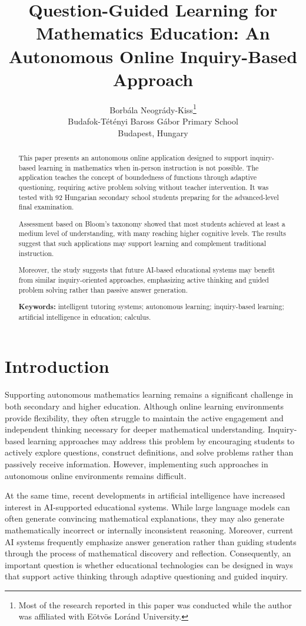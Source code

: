 \documentclass[11pt]{article}
\title{\textbf{Question-Guided Learning for Mathematics Education: An Autonomous Online Inquiry-Based Approach}}
\author{
Borbála Neogrády-Kiss\thanks{Most of the research reported in this paper was conducted while the author was affiliated with Eötvös Loránd University.}\\
Budafok-Tétényi Baross Gábor Primary School\\
Budapest, Hungary
}
\date{}
\begin{document}
\maketitle

\begin{abstract}

This paper presents an autonomous online application designed to support inquiry-based learning in mathematics when in-person instruction is not possible. The application teaches the concept of boundedness of functions through adaptive questioning, requiring active problem solving without teacher intervention. It was tested with 92 Hungarian secondary school students preparing for the advanced-level final examination.

Assessment based on Bloom's taxonomy showed that most students achieved at least a medium level of understanding, with many reaching higher cognitive levels. The results suggest that such applications may support learning and complement traditional instruction.

Moreover, the study suggests that future AI-based educational systems may benefit from similar inquiry-oriented approaches, emphasizing active thinking and guided problem solving rather than passive answer generation.

\bigskip

\noindent
\textbf{Keywords:}
intelligent tutoring systems;
autonomous learning;
inquiry-based learning;
artificial intelligence in education;
calculus.

\end{abstract}

\section{Introduction}

Supporting autonomous mathematics learning remains a significant challenge in both secondary and higher education. Although online learning environments provide flexibility, they often struggle to maintain the active engagement and independent thinking necessary for deeper mathematical understanding. Inquiry-based learning approaches may address this problem by encouraging students to actively explore questions, construct definitions, and solve problems rather than passively receive information. However, implementing such approaches in autonomous online environments remains difficult.

At the same time, recent developments in artificial intelligence have increased interest in AI-supported educational systems. While large language models can often generate convincing mathematical explanations, they may also generate mathematically incorrect or internally inconsistent reasoning. Moreover, current AI systems frequently emphasize answer generation rather than guiding students through the process of mathematical discovery and reflection. Consequently, an important question is whether educational technologies can be designed in ways that support active thinking through adaptive questioning and guided inquiry.
\end{document}
